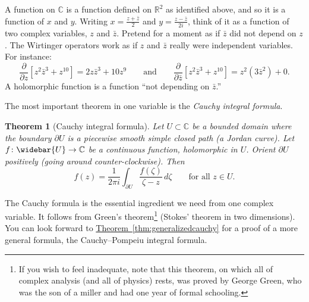 \documentclass[12pt,openany]{book}
\newcommand{\C}{{\mathbb{C}}}
\newcommand{\R}{{\mathbb{R}}}
\newcommand{\myindex}[1]{#1\index{#1}}
\theoremstyle{plain}
\newtheorem{thm}{Theorem}[section]
\theoremstyle{remark}
\theoremstyle{definition}
\theoremstyle{exercise}
\theoremstyle{example}
\newcommand{\thmref}[1]{\hyperref[#1]{Theorem~\ref*{#1}}}
\begin{document}
A function on $\C$ is a function defined on
$\R^2$ as identified above, and so it is a function of $x$ and $y$.
Writing
$x = \frac{z+\bar{z}}{2}$ and
$y = \frac{z-\bar{z}}{2i}$, think of it as a function of two
complex variables, $z$ and $\bar{z}$.  Pretend for a moment as if $\bar{z}$ did not
depend on $z$.
The Wirtinger operators
work as if $z$ and $\bar{z}$ really were independent variables.  For
instance:
\begin{equation*}
\frac{\partial}{\partial z}
\left[ z^2 \bar{z}^3 + z^{10} \right]
=
2z \bar{z}^3 + 10 z^{9}
\qquad
\text{and}
\qquad
\frac{\partial}{\partial \bar{z}}
\left[ z^2 \bar{z}^3 + z^{10} \right]
=
z^2 ( 3 \bar{z}^2 ) + 0 .
\end{equation*}
A holomorphic function is a function ``not depending on $\bar{z}$.''

The most important theorem in one variable is
the \emph{\myindex{Cauchy integral formula}}.

\begin{thm}[Cauchy integral formula]
Let $U \subset \C$ be a bounded domain where the boundary $\partial U$
is a piecewise smooth
simple closed path (a Jordan curve).  Let $f \colon \widebar{U} \to \C$ be a continuous function,
holomorphic in $U$.
Orient $\partial U$ positively (going around counter-clockwise).
Then
\begin{equation*}
f(z) =
\frac{1}{2\pi i}
\int_{\partial U}
\frac{f(\zeta)}{\zeta-z}
\,
d \zeta
\qquad \text{for all $z \in U$.}
\end{equation*}
\end{thm}


The Cauchy formula is the essential ingredient we need from
one complex variable.  It follows
from Green's theorem\footnote{If you wish to feel inadequate,
note that this theorem, on which all of complex analysis (and all of physics)
rests, was proved by
George Green, who was the son of a miller and had one year of formal
schooling.}  (Stokes' theorem in two
dimensions).  You can look forward to
\thmref{thm:generalizedcauchy} for a proof of a more general formula,
the Cauchy--Pompeiu integral formula.
\end{document}
